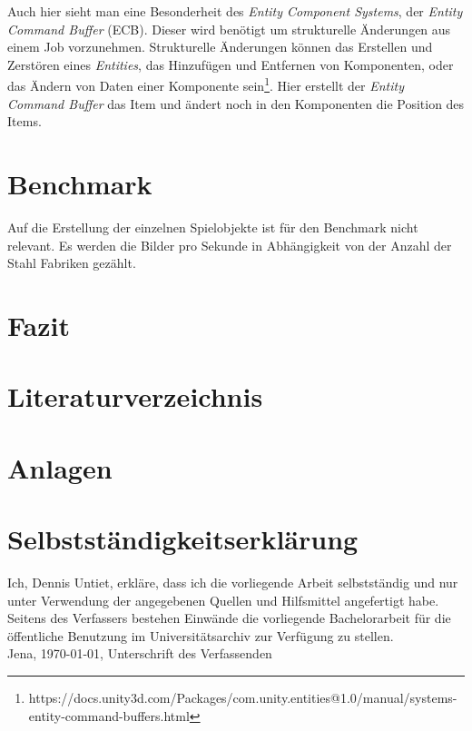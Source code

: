 \documentclass[12pt, titlepage]{article}
\begin{document}
Auch hier sieht man eine Besonderheit des \textit{Entity Component Systems}, der \textit{Entity Command Buffer} (ECB). Dieser wird  benötigt um strukturelle Änderungen aus einem Job vorzunehmen. Strukturelle Änderungen können das Erstellen und Zerstören eines \textit{Entities}, das Hinzufügen und Entfernen von Komponenten, oder das Ändern von Daten einer Komponente sein\footnote{https://docs.unity3d.com/Packages/com.unity.entities@1.0/manual/systems-entity-command-buffers.html}. Hier erstellt der \textit{Entity Command Buffer} das Item und ändert noch in den Komponenten die Position des Items. 
\newpage
\section{Benchmark}
Auf die Erstellung der einzelnen Spielobjekte ist für den Benchmark nicht relevant. Es werden die Bilder pro Sekunde in Abhängigkeit von der Anzahl der Stahl Fabriken gezählt. 
\newpage
\section{Fazit}
\newpage
\section{Literaturverzeichnis}



\newpage
\section{Anlagen}
\newpage
\section{Selbstständigkeitserklärung}
Ich, Dennis Untiet, erkläre, dass ich die vorliegende Arbeit selbstständig und nur unter Verwendung der
angegebenen Quellen und Hilfsmittel angefertigt habe.\\
Seitens des Verfassers bestehen Einwände die vorliegende Bachelorarbeit für die öffentliche Benutzung im
Universitätsarchiv zur Verfügung zu stellen.\\
Jena, \today, Unterschrift des Verfassenden
\end{document}
